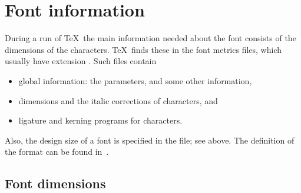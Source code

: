 \documentclass{book}
\begin{document}
\section{Font information}

During a run of \TeX\ the main information needed about the
%
font consists of the dimensions of the characters.
\TeX\ finds these in the font metrics files, which usually have
extension . Such files
contain \begin{itemize} \item global information: the 
parameters, and some other information,
\item dimensions and the italic corrections of characters, and
\altt
\item ligature and kerning programs for characters.
	\end{itemize}
Also, the design size of a font is specified in the  file;
see above. The definition of the  format can be found
in~\cite{Knuth:TeXprogram}.

\subsection{Font dimensions}
\label{font:dims}
\end{document}
